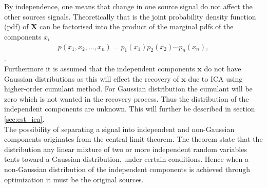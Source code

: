 \\
\\
By independence, one means that change in one source signal do not affect the other sources signals. Theoretically that is the joint probability density function (pdf) of $\textbf{X}$ can be factorised into the product of the marginal pdfs of the components $x_i$
\begin{align*}
p(x_1, x_2, \dots, x_n) = p_1 (x_1) p_2(x_2) \cdots p_n(x_n),
\end{align*}.
\\
Furthermore it is assumed that the independent components $\mathbf{x}$ do not have Gaussian distributions as this will effect the recovery of $\mathbf{x}$ due to ICA using higher-order cumulant method. For Gaussian distribution the cumulant will be zero which is not wanted in the recovery process. Thus the distribution of the independent components are unknown. This will further be described in section \ref{sec:est_ica}.
\\
The possibility of separating a signal into independent and non-Gaussian components originates from the central limit theorem\cite[p. 34]{ICA}. The theorem state that the distribution any linear mixture of two or more independent random variables tents toward a Gaussian distribution, under certain conditions. Hence when a non-Gaussian distribution of the independent components is achieved through optimization it must be the original sources.\\

